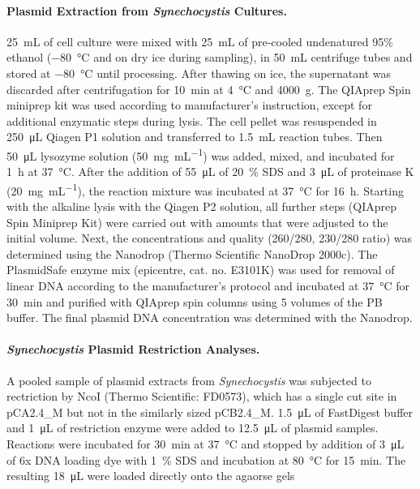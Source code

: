 \documentclass[10pt,a4]{article}
\newcommand{\mL}{\milli\liter}
\newcommand{\scyst}{\textit{Synechocystis}}
\begin{document}
\paragraph{Plasmid Extraction from \scyst{} Cultures.}
\SI{25}{\mL} of cell culture were mixed with \SI{25}{\mL} of
pre-cooled undenatured 95\% ethanol (\SI{-80}{\celsius} and on dry ice
during sampling), in \SI{50}{\mL} centrifuge tubes and stored at
\SI{-80}{\celsius} until processing. After thawing on ice, the
supernatant was discarded after centrifugation for \SI{10}{\minute} at
\SI{4}{\celsius} and \SI{4000}{g}. The QIAprep Spin miniprep kit was
used according to manufacturer's instruction, except for additional
enzymatic steps during lysis. The cell pellet was resuspended in
\SI{250}{\micro\liter} Qiagen P1 solution and transferred to
\SI{1.5}{\mL} reaction tubes. Then \SI{50}{\micro\liter} lysozyme
solution (\SI{50}{\milli\gram\per\milli\liter}) was added, mixed, and
incubated for \SI{1}{\hour} at \SI{37}{\celsius}.  After the addition
of \SI{55}{\micro\liter} of \SI{20}{\percent} SDS and
\SI{3}{\micro\liter} of proteinase K
(\SI{20}{\milli\gram\per\milli\liter}), the reaction mixture was
incubated at \SI{37}{\celsius} for \SI{16}{\hour}.  Starting with the
alkaline lysis with the Qiagen P2 solution, all further steps (QIAprep
Spin Miniprep Kit) were carried out with amounts that were adjusted to
the initial volume. Next, the concentrations and quality (260/280,
230/280 ratio) was determined using the Nanodrop (Thermo Scientific
NanoDrop 2000c).  The PlasmidSafe enzyme mix (epicentre,
cat. no. E3101K) was used for removal of linear DNA according to the
manufacturer's protocol and incubated at \SI{37}{\celsius} for
\SI{30}{\minute} and purified with QIAprep spin columns using 5
volumes of the PB buffer. The final plasmid DNA concentration was
determined with the Nanodrop.


\paragraph{\scyst{} Plasmid Restriction Analyses.}
A pooled sample of plasmid extracts from \scyst{} was subjected to
rectriction by NcoI (Thermo Scientific: FD0573), which has a single
cut site in pCA2.4\_M but not in the similarly sized pCB2.4\_M.
\SI{1.5}{\uL} of FastDigest buffer and \SI{1}{\uL} of restriction
enzyme were added to \SI{12.5}{\uL} of plasmid samples. Reactions were
incubated for \SI{30}{\minute} at \SI{37}{\celsius} and stopped by
addition of \SI{3}{\uL} of 6x DNA loading dye with \SI{1}{\percent}
SDS and incubation at \SI{80}{\celsius} for \SI{15}{\minute}. The
resulting \SI{18}{\uL} were loaded directly onto the agaorse gels
\end{document}
